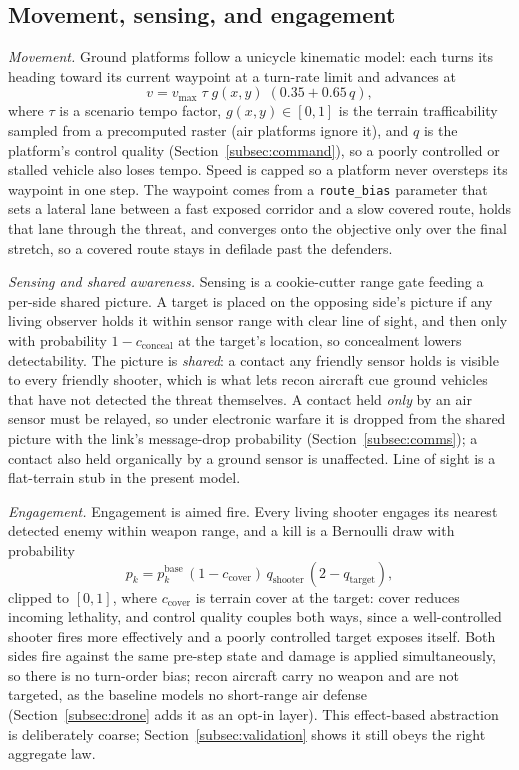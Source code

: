 \documentclass[11pt]{article}
\begin{document}
\subsection{Movement, sensing, and engagement}
\emph{Movement.} Ground platforms follow a unicycle kinematic model: each turns its heading toward its current waypoint at a turn-rate limit and advances at
\[
v = v_{\max}\;\tau\;g(x,y)\;(0.35 + 0.65\,q),
\]
where $\tau$ is a scenario tempo factor, $g(x,y)\in[0,1]$ is the terrain trafficability sampled from a precomputed raster (air platforms ignore it), and $q$ is the platform's control quality (Section~\ref{subsec:command}), so a poorly controlled or stalled vehicle also loses tempo. Speed is capped so a platform never oversteps its waypoint in one step. The waypoint comes from a \texttt{route\_bias} parameter that sets a lateral lane between a fast exposed corridor and a slow covered route, holds that lane through the threat, and converges onto the objective only over the final stretch, so a covered route stays in defilade past the defenders.

\emph{Sensing and shared awareness.} Sensing is a cookie-cutter range gate feeding a per-side shared picture. A target is placed on the opposing side's picture if any living observer holds it within sensor range with clear line of sight, and then only with probability $1-c_{\text{conceal}}$ at the target's location, so concealment lowers detectability. The picture is \emph{shared}: a contact any friendly sensor holds is visible to every friendly shooter, which is what lets recon aircraft cue ground vehicles that have not detected the threat themselves. A contact held \emph{only} by an air sensor must be relayed, so under electronic warfare it is dropped from the shared picture with the link's message-drop probability (Section~\ref{subsec:comms}); a contact also held organically by a ground sensor is unaffected. Line of sight is a flat-terrain stub in the present model.

\emph{Engagement.} Engagement is aimed fire. Every living shooter engages its nearest detected enemy within weapon range, and a kill is a Bernoulli draw with probability
\[
p_k = p_k^{\text{base}}\,(1 - c_{\text{cover}})\,q_{\text{shooter}}\,(2 - q_{\text{target}}),
\]
clipped to $[0,1]$, where $c_{\text{cover}}$ is terrain cover at the target: cover reduces incoming lethality, and control quality couples both ways, since a well-controlled shooter fires more effectively and a poorly controlled target exposes itself. Both sides fire against the same pre-step state and damage is applied simultaneously, so there is no turn-order bias; recon aircraft carry no weapon and are not targeted, as the baseline models no short-range air defense (Section~\ref{subsec:drone} adds it as an opt-in layer). This effect-based abstraction is deliberately coarse; Section~\ref{subsec:validation} shows it still obeys the right aggregate law.
\end{document}
